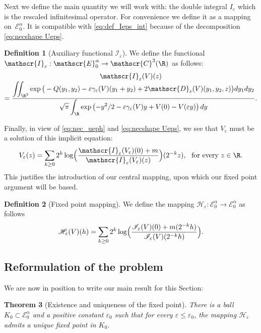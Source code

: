 \documentclass[10pt]{amsart}
\let\mathcal\mathscr
\newcommand{\cC}{\mathcal{C}}
\newcommand{\cI}{\mathcal{I}}
\theoremstyle{plain}
\newtheorem{thm}{Theorem}[section]
\theoremstyle{definition}
\newtheorem{definition}[thm]{Definition}
\renewcommand{\H}{\mathcal{H}_\eps}
\newcommand{\D}{\mathcal{D}_\eps}
\let\eps\varepsilon
\let\ds\displaystyle
\newcommand{\Eaz}{\mathcal{E}^\alpha_0}
\begin{document}
Next we define the main quantity we will work with: the double integral $I_\eps$ which is the rescaled infinitesimal operator. For convenience we define it as a mapping on~$\Eaz$. It is compatible with \eqref{eq:def_Ieps_int} because of the decomposition \eqref{eq:necshape Ueps}.
\begin{definition}[Auxiliary functional $\cI_\eps$]\label{def Ieps}
We define the functional $\cI_\eps: \Eaz \to \cC^3(\R)$ as follows:\vspace*{-3pt}
\begin{multline}\label{eq:def_Ieps}
\cI_\eps(V)(z)\\[-3pt]
= \dfrac{\ds \iint_{\R^2} \exp\big(-Q(y_1,y_2)-\eps \gamma_\eps(V)(y_1+y_2) +2\D(V)(y_1,y_2,z) \big)d y_1 d y_2 }
{\ds\sqrt{\pi } \int_\R \exp\left(- y^2/2 -\eps \gamma_\eps (V) y + V(0)- V(\eps y) \right) d y}.
\end{multline}
\end{definition}
Finally, in view of \eqref{eq:nec_ueph} and \eqref{eq:necshape Ueps}, we see that $V_\eps$ must be a solution of this implicit equation:\vspace*{-3pt}
\begin{equation}\label{eq:nec_Veps}
V_\eps (z) =\sum_{k\geq 0} 2^k \log \Bigl(\dfrac{\cI_\eps(V_\eps)(0)+ m}{\cI_\eps(V_\eps)(z)} \Bigr) (2^{-k}z), \ \hbox{ for every } z \in \R.
\end{equation}
This justifies the introduction of our central mapping, upon which our fixed point argument will be based.
\begin{definition}[Fixed point mapping]\label{def:H}
We define the mapping $\H: \Eaz \to \Eaz$ as follows\vspace*{-3pt}
\begin{equation}\label{eq:defH}
\H(V)(h) = \sum_{k \geq 0} 2^k \log \Bigl(\dfrac{\cI_\eps(V) (0)+ m(2^{-k} h)}{\cI_\eps(V) (2^{-k}h)} \Bigr).
\end{equation}
\end{definition}

\subsection{Reformulation of the problem}
We are now in position to write our main result for this Section:

\begin{thm}[Existence and uniqueness of the fixed point]\label{existunique fixedpoint}
There is a ball $K_0 \subset \Eaz$ and a positive constant $\eps_0$ such that for every $\eps\leq \eps_0$, the mapping $\H$ admits a unique fixed point in $K_0$.
\end{thm}
\end{document}
